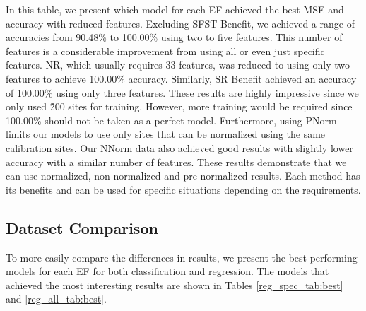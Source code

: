 \documentclass[12pt,letterpaper]{article}
\begin{document}
In this table, we present which model for each \ac{EF} achieved the best MSE and accuracy with reduced features.
Excluding \ac{SFST} Benefit, we achieved a range of accuracies from 90.48\% to 100.00\% using two to five features.
This number of features is a considerable improvement from using all or even just specific features.
\ac{NR}, which usually requires 33 features, was reduced to using only two features to achieve 100.00\% accuracy.
Similarly, \ac{SR} Benefit achieved an accuracy of 100.00\% using only three features.
These results are highly impressive since we only used \~200 sites for training.
However, more training would be required since 100.00\% should not be taken as a perfect model.
Furthermore, using \ac{PNorm} limits our models to use only sites that can be normalized using the same calibration sites.
Our \ac{NNorm} data also achieved good results with slightly lower accuracy with a similar number of features.
These results demonstrate that we can use normalized, non-normalized and pre-normalized results.
Each method has its benefits and can be used for specific situations depending on the requirements.


\subsection{Dataset Comparison}
To more easily compare the differences in results, we present the best-performing models for each \ac{EF} for both classification and regression. The models that achieved the most interesting results are shown in Tables \ref{reg_spec_tab:best} and \ref{reg_all_tab:best}.
\end{document}
